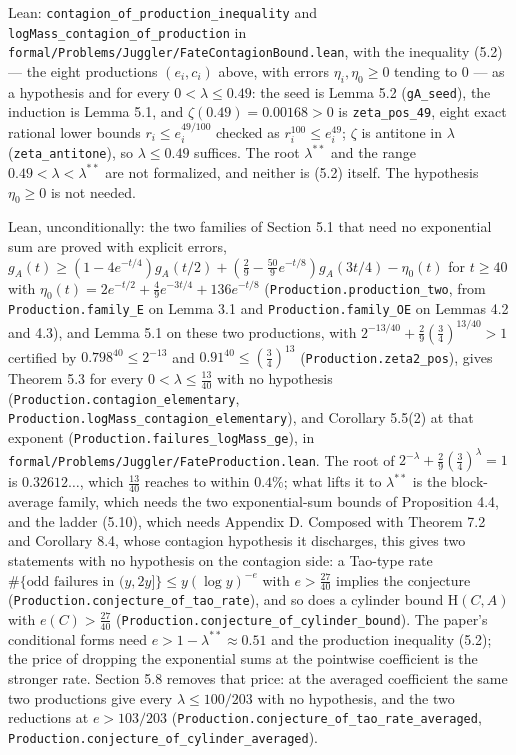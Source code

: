 \documentclass[11pt,a4paper]{article}
\begin{document}
Lean: \texttt{\nolinkurl{contagion_of_production_inequality}} and
\texttt{\nolinkurl{logMass_contagion_of_production}} in
\texttt{\nolinkurl{formal/Problems/Juggler/FateContagionBound.lean}},
with the inequality (5.2) --- the eight productions \((e_i,c_i)\) above,
with errors \(\eta_i,\eta_0\ge 0\) tending to \(0\) --- as a hypothesis
and for every \(0<\lambda\le 0.49\): the seed is Lemma 5.2
(\texttt{\nolinkurl{gA_seed}}), the induction is Lemma 5.1, and
\(\zeta(0.49)=0.00168>0\) is \texttt{\nolinkurl{zeta_pos_49}}, eight
exact rational lower bounds \(r_i\le e_i^{49/100}\) checked as
\(r_i^{100}\le e_i^{49}\); \(\zeta\) is antitone in \(\lambda\)
(\texttt{\nolinkurl{zeta_antitone}}), so \(\lambda\le 0.49\) suffices.
The root \(\lambda^{**}\) and the range \(0.49<\lambda<\lambda^{**}\)
are not formalized, and neither is (5.2) itself. The hypothesis
\(\eta_0\ge 0\) is not needed.

Lean, unconditionally: the two families of Section 5.1 that need no
exponential sum are proved with explicit errors,
\(g_A(t)\ge(1-4e^{-t/4})g_A(t/2)+(\tfrac29-\tfrac{50}9e^{-t/8})g_A(3t/4)-\eta_0(t)\)
for \(t\ge40\) with
\(\eta_0(t)=2e^{-t/2}+\tfrac49e^{-3t/4}+136e^{-t/8}\)
(\texttt{\nolinkurl{Production.production_two}}, from
\texttt{\nolinkurl{Production.family_E}} on Lemma 3.1 and
\texttt{\nolinkurl{Production.family_OE}} on Lemmas 4.2 and 4.3), and
Lemma 5.1 on these two productions, with
\(2^{-13/40}+\tfrac29(\tfrac34)^{13/40}>1\) certified by
\(0.798^{40}\le2^{-13}\) and \(0.91^{40}\le(\tfrac34)^{13}\)
(\texttt{\nolinkurl{Production.zeta2_pos}}), gives Theorem 5.3 for every
\(0<\lambda\le\tfrac{13}{40}\) with no hypothesis
(\texttt{\nolinkurl{Production.contagion_elementary}},
\texttt{\nolinkurl{Production.logMass_contagion_elementary}}), and
Corollary 5.5(2) at that exponent
(\texttt{\nolinkurl{Production.failures_logMass_ge}}), in
\texttt{\nolinkurl{formal/Problems/Juggler/FateProduction.lean}}. The
root of \(2^{-\lambda}+\tfrac29(\tfrac34)^\lambda=1\) is
\(0.32612\ldots\), which \(\tfrac{13}{40}\) reaches to within \(0.4\%\);
what lifts it to \(\lambda^{**}\) is the block-average family, which
needs the two exponential-sum bounds of Proposition 4.4, and the ladder
(5.10), which needs Appendix D. Composed with Theorem 7.2 and Corollary
8.4, whose contagion hypothesis it discharges, this gives two statements
with no hypothesis on the contagion side: a Tao-type rate
\(\#\{\text{odd failures in }(y,2y]\}\le y(\log y)^{-e}\) with
\(e>\tfrac{27}{40}\) implies the conjecture
(\texttt{\nolinkurl{Production.conjecture_of_tao_rate}}), and so does a
cylinder bound \(\mathrm H(C,A)\) with \(e(C)>\tfrac{27}{40}\)
(\texttt{\nolinkurl{Production.conjecture_of_cylinder_bound}}). The
paper's conditional forms need \(e>1-\lambda^{**}\approx0.51\) and the
production inequality (5.2); the price of dropping the exponential sums
at the pointwise coefficient is the stronger rate. Section 5.8 removes
that price: at the averaged coefficient the same two productions give
every \(\lambda\le100/203\) with no hypothesis, and the two reductions
at \(e>103/203\)
(\texttt{\nolinkurl{Production.conjecture_of_tao_rate_averaged}},
\texttt{\nolinkurl{Production.conjecture_of_cylinder_averaged}}).
\end{document}
